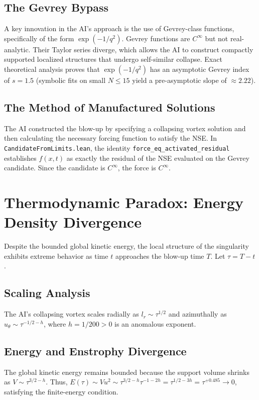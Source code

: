 \documentclass[11pt,a4paper]{article}
\theoremstyle{definition}
\begin{document}
\subsection{The Gevrey Bypass}
A key innovation in the AI's approach is the use of Gevrey-class functions, specifically of the form $\exp(-1/q^2)$. Gevrey functions are $C^\infty$ but not real-analytic. Their Taylor series diverge, which allows the AI to construct compactly supported localized structures that undergo self-similar collapse. Exact theoretical analysis proves that $\exp(-1/q^2)$ has an asymptotic Gevrey index of $s = 1.5$ (symbolic fits on small $N \le 15$ yield a pre-asymptotic slope of $\approx 2.22$).

\subsection{The Method of Manufactured Solutions}
The AI constructed the blow-up by specifying a collapsing vortex solution and then calculating the necessary forcing function to satisfy the NSE. In \texttt{CandidateFromLimits.lean}, the identity \texttt{force\_eq\_activated\_residual} establishes $f(x,t)$ as exactly the residual of the NSE evaluated on the Gevrey candidate. Since the candidate is $C^\infty$, the force is $C^\infty$.

\section{Thermodynamic Paradox: Energy Density Divergence}

Despite the bounded global kinetic energy, the local structure of the singularity exhibits extreme behavior as time $t$ approaches the blow-up time $T$. Let $\tau = T - t$.

\subsection{Scaling Analysis}
The AI's collapsing vortex scales radially as $l_r \sim \tau^{1/2}$ and azimuthally as $u_\theta \sim \tau^{-1/2-h}$, where $h = 1/200 > 0$ is an anomalous exponent.

\subsection{Energy and Enstrophy Divergence}
The global kinetic energy remains bounded because the support volume shrinks as $V \sim \tau^{3/2-h}$. Thus, $E(\tau) \sim V u^2 \sim \tau^{3/2-h} \tau^{-1-2h} = \tau^{1/2-3h} = \tau^{+0.485} \to 0$, satisfying the finite-energy condition.
\end{document}
